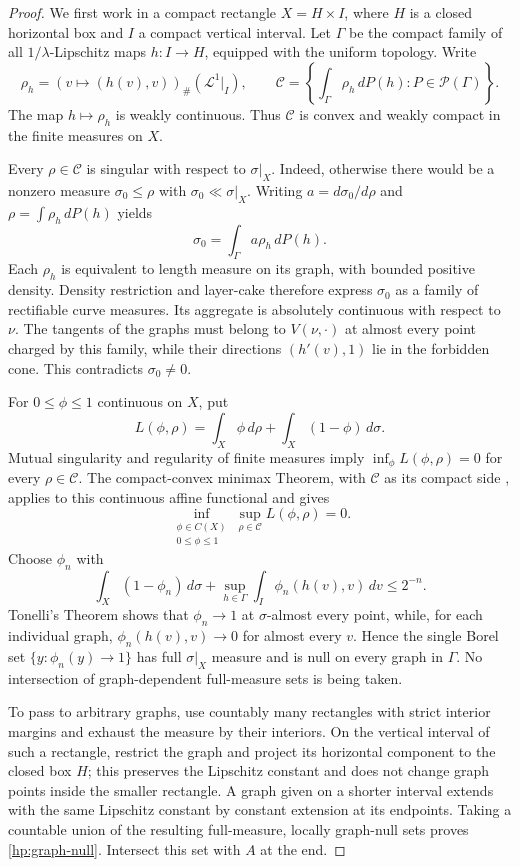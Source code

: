 \documentclass[11pt]{article}
\numberwithin{equation}{section}
\theoremstyle{definition}
\theoremstyle{remark}
\newcommand{\cL}{\mathcal L}
\begin{document}
\begin{proof}
We first work in a compact rectangle $X=H\times I$, where $H$ is a
closed horizontal box and $I$ a compact vertical interval.  Let
$\Gamma$ be the compact family of all $1/\lambda$-Lipschitz maps
$h:I\to H$, equipped with the uniform topology.  Write
\[
 \rho_h=(v\mapsto(h(v),v))_\#(\cL^1\vert_I),
 \qquad
 \mathcal C=\left\{\int_\Gamma\rho_h\,dP(h):
                         P\in\mathcal P(\Gamma)\right\}.
\]
The map $h\mapsto\rho_h$ is weakly continuous.  Thus $\mathcal C$
is convex and weakly compact in the finite measures on $X$.

Every $\rho\in\mathcal C$ is singular with respect to
$\sigma\vert_X$.  Indeed, otherwise there would be a nonzero measure
$\sigma_0\le\rho$ with $\sigma_0\ll\sigma\vert_X$.  Writing
$a=d\sigma_0/d\rho$ and $\rho=\int\rho_h\,dP(h)$ yields
\[
 \sigma_0=\int_\Gamma a\rho_h\,dP(h).
\]
Each $\rho_h$ is equivalent to length measure on its graph, with
bounded positive density.  Density restriction and layer-cake
therefore express $\sigma_0$ as a family of rectifiable curve measures.
Its aggregate is absolutely continuous with respect to $\nu$.
The tangents of the graphs must belong to $V(\nu,\cdot)$ at almost
every point charged by this family, while their directions
$(h'(v),1)$ lie in the forbidden cone.  This contradicts
$\sigma_0\ne0$.

For $0\le\phi\le1$ continuous on $X$, put
\[
 L(\phi,\rho)=\int_X\phi\,d\rho
                 +\int_X(1-\phi)\,d\sigma.
\]
Mutual singularity and regularity of finite measures imply
$\inf_\phi L(\phi,\rho)=0$ for every $\rho\in\mathcal C$.
The compact-convex minimax Theorem, with $\mathcal C$ as its compact
side \cite[Theorem~4.2]{Sion1958}, applies to this continuous affine functional
and gives
\[
 \inf_{\substack{\phi\in C(X)\\0\le\phi\le1}}
     \sup_{\rho\in\mathcal C}L(\phi,\rho)=0.
\]
Choose $\phi_n$ with
\[
 \int_X(1-\phi_n)\,d\sigma
       +\sup_{h\in\Gamma}\int_I\phi_n(h(v),v)\,dv
 \le2^{-n}.
\]
Tonelli's Theorem shows that $\phi_n\to1$ at $\sigma$-almost every
point, while, for each individual graph, $\phi_n(h(v),v)\to0$
for almost every $v$.  Hence the single Borel set
$\{y:\phi_n(y)\to1\}$ has full $\sigma\vert_X$ measure and is
null on every graph in $\Gamma$.  No intersection of graph-dependent
full-measure sets is being taken.

To pass to arbitrary graphs, use countably many rectangles with
strict interior margins and exhaust the measure by their interiors.
On the vertical interval of such a rectangle, restrict the graph
and project its horizontal component to the closed box $H$; this
preserves the Lipschitz constant and does not change graph points
inside the smaller rectangle.  A graph given on a shorter interval
extends with the same Lipschitz constant by constant extension at its
endpoints.  Taking a countable union of the resulting full-measure,
locally graph-null sets proves \eqref{hp:graph-null}.  Intersect this
set with $A$ at the end.
\end{proof}
\end{document}
